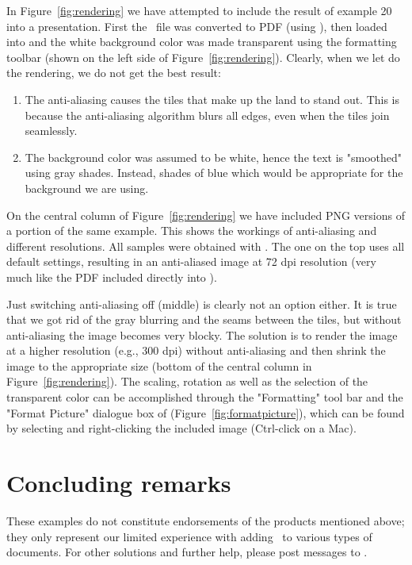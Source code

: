 In Figure~\ref{fig:rendering} we have attempted to include the result of example 20 into a  presentation. First the \PS\ file was converted to PDF (using ), then loaded into  and the white background color was made transparent using the formatting toolbar (shown on the left side of Figure~\ref{fig:rendering}). Clearly, when we let  do the rendering, we do not get the best result:
\begin{enumerate}
\item The anti-aliasing causes the tiles that make up the land to stand out. This is because the anti-aliasing algorithm blurs all edges, even when the tiles join seamlessly.
\item The background color was assumed to be white, hence the text is "smoothed" using gray shades. Instead, shades of blue which would be appropriate for the background we are using.
\end{enumerate}

On the central column of Figure~\ref{fig:rendering} we have included PNG versions of a portion of the same example. This shows the workings of anti-aliasing and different resolutions. All samples were obtained with . The one on the top uses all default settings, resulting in an anti-aliased image at 72 dpi resolution (very much like the PDF included directly into ).

Just switching anti-aliasing off (middle) is clearly not an option either. It is true that we got rid of the gray blurring and the seams between the tiles, but without anti-aliasing the image becomes very blocky. The solution is to render the image at a higher resolution (e.g., 300 dpi) without anti-aliasing and then shrink the image to the appropriate size (bottom of the central column in Figure~\ref{fig:rendering}). The scaling, rotation as well as the selection of the transparent color can be accomplished through the "Formatting" tool bar and the "Format Picture" dialogue box of  (Figure~\ref{fig:formatpicture}), which can be found by selecting and right-clicking the included image (Ctrl-click on a Mac).

\section{Concluding remarks}

These examples do not constitute endorsements of the products mentioned above; they only represent our limited experience with adding \PS\ to various types of documents.  For other solutions and further help, please post messages to
.
